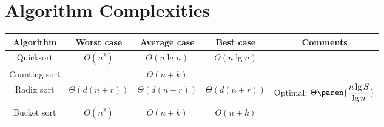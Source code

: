 \section{Algorithm Complexities}

\begin{tabular}{|c|c c c|c|}
    \hline
    Algorithm & Worst case & Average case & Best case & Comments \\
    \hline
    Quicksort & $O(n^2)$ & $O(n\lg n)$ & $O(n\lg n)$ & \\
    Counting sort & \multicolumn{3}{c|}{$\Theta(n + k)$} &\\
    Radix sort & $\Theta(d(n + r))$ & $\Theta(d(n + r))$ & 
    $\Theta(d(n + r))$ & Optimal: $\displaystyle \Theta\paren{\frac{n \lg S}{\lg n}}$ \\
    Bucket sort & $O(n^2)$ & $O(n + k)$ & $O(n + k)$ & \\
    \hline
\end{tabular}
